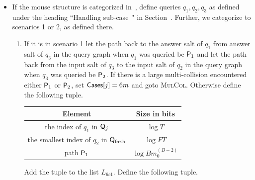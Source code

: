 \begin{enumerate}
\begin{enumerate}
\begin{itemize}
\begin{itemize}
    \item If the mouse structure is categorized in~, define queries $q_1,q_2,q_3$ as defined under the heading ``Handling sub-case~" in Section~. Further, we categorize to scenarios 1 or 2, as defined there. 
    \begin{enumerate}
    \item If it is in scenario 1 let the path back to the answer salt of $q_1$ from answer salt of $q_3$ in the query graph when $q_1$ was queried be $\mathsf{P}_1$ and let the path back from the input salt of $q_3$ to the input salt of $q_2$ in the query graph when $q_3$ was queried be $\mathsf{P}_2$.
     If there is a large multi-collision encountered either $\mathsf{P}_1$ or $\mathsf{P}_2$, set $\mathsf{Cases}[j]=6m$ and goto \textsc{MulCol}.
    Otherwise define the following tuple.
  \begin{center}
    \begin{tabular}{|c|c|}\hline

    Element & Size in bits \\ \hline\hline

    the index of $q_1$ in $\mathsf{Q}_j$ & $\log T$\\ \hline

    the smallest index  of $q_2$ in $\mathsf{Q}_\textsf{fresh}$ & $\log FT$   \\\hline
            
    path $\mathsf{P}_1$ & $ \log Bm_0^{(B-2)}$\\\hline
    
    \end{tabular}
    \end{center}
    Add the tuple to the list $L_{6c1}$. Define the following tuple.
    \begin{center}
      \begin{tabular}{|c|c|}\hline
  

\end{tabular}
\end{center}
\end{enumerate}
\end{itemize}
\end{itemize}
\end{enumerate}
\end{enumerate}
